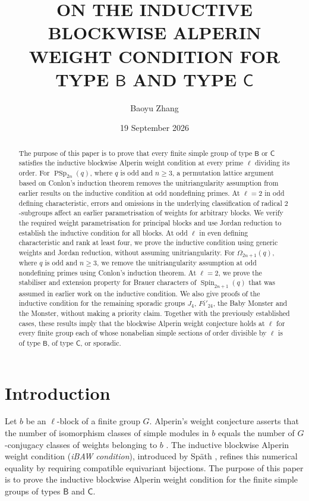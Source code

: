 \documentclass[10pt]{amsart}
\title[On the iBAW condition for Types $\mathsf B$ and $\mathsf C$]
{ON THE INDUCTIVE BLOCKWISE ALPERIN WEIGHT CONDITION
FOR TYPE $\mathsf B$ AND TYPE $\mathsf C$}
\author{Baoyu Zhang}
\date{19 September 2026}
\theoremstyle{definition}
\renewcommand{\geq}{\geqslant}
\DeclareMathOperator{\PSp}{PSp}
\numberwithin{equation}{section}
\numberwithin{table}{section}
\begin{document}
\begin{abstract}
The purpose of this paper is to prove that every finite simple group of type
$\mathsf B$ or $\mathsf C$ satisfies the inductive blockwise Alperin
weight condition at every prime $\ell$ dividing its order.  For
$\PSp_{2n}(q)$, where $q$ is odd and $n\geq3$, a permutation lattice argument based on Conlon's induction theorem removes the
unitriangularity assumption from earlier results on the inductive condition at
odd nondefining primes.  At $\ell=2$ in odd defining characteristic,
errors and omissions in the underlying classification of radical
$2$-subgroups affect an earlier parametrisation of weights for arbitrary blocks.  We verify the required weight parametrisation for principal blocks
and use Jordan reduction to establish the inductive condition for all blocks.  At odd $\ell$ in even defining characteristic and rank at least four, we prove
the inductive condition using generic weights and Jordan reduction, without
assuming unitriangularity.
For $\Omega_{2n+1}(q)$, where $q$ is odd and $n\geq3$, we remove the
unitriangularity assumption at odd nondefining primes using Conlon's
induction theorem. At $\ell=2$, we prove the stabiliser and extension property for Brauer
characters of $\operatorname{Spin}_{2n+1}(q)$ that was assumed in earlier work
on the inductive condition.
We also give proofs of the inductive condition for the remaining sporadic
groups $J_4$, $Fi'_{24}$,
the Baby Monster and the Monster, without making a priority claim.
Together with the previously established cases, these results imply that
the blockwise Alperin weight conjecture holds at $\ell$
for every finite group each of whose nonabelian simple sections of order
divisible by $\ell$ is of type $\mathsf B$, of type $\mathsf C$, or sporadic.
\end{abstract}

\maketitle

\section{Introduction}

Let $b$ be an $\ell$-block of a finite group $G$.  Alperin's weight conjecture
asserts that the number of isomorphism classes of simple modules in $b$ equals
the number of $G$-conjugacy classes of weights belonging to $b$
\cite{Alperin1987}.  The inductive blockwise Alperin weight condition
(\emph{iBAW condition}), introduced by Sp\"ath
\cite[Definition~4.1]{Spath2013}, refines this numerical equality by requiring
compatible equivariant bijections.  The purpose of this paper is to prove the
inductive blockwise Alperin weight condition for the finite simple groups of
types $\mathsf B$ and $\mathsf C$.
\end{document}
